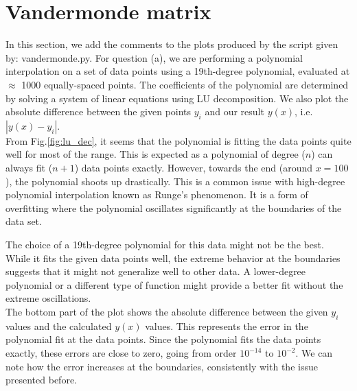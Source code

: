 \section{Vandermonde matrix}

In this section, we add the comments to the plots produced by the script given by: vandermonde.py.
For question (a), we are performing a polynomial interpolation on a set of data points using a 19th-degree polynomial, evaluated at $\approx$ 1000 equally-spaced points. The coefficients of the polynomial are determined by solving a system of linear equations using LU decomposition. We also plot the absolute difference between the given points $y_{i}$ and our result $y(x)$, i.e. $|y(x) - y_{i}|$. \\

From Fig.\ref{fig:lu_dec}, it seems that the polynomial is fitting the data points quite well for most of the range. This is expected as a polynomial of degree ($n$) can always fit ($n+1$) data points exactly. However, towards the end (around $x=100$), the polynomial shoots up drastically. This is a common issue with high-degree polynomial interpolation known as Runge's phenomenon. It is a form of overfitting where the polynomial oscillates significantly at the boundaries of the data set.

The choice of a 19th-degree polynomial for this data might not be the best. While it fits the given data points well, the extreme behavior at the boundaries suggests that it might not generalize well to other data. A lower-degree polynomial or a different type of function might provide a better fit without the extreme oscillations. \\

The bottom part of the plot shows the absolute difference between the given $y_{i}$ values and the calculated $y(x)$ values. This represents the error in the polynomial fit at the data points. Since the polynomial fits the data points exactly, these errors are close to zero, going from order $10^{-14}$ to $10^{-2}$. We can note how the error increases at the boundaries, consistently with the issue presented before. \\

